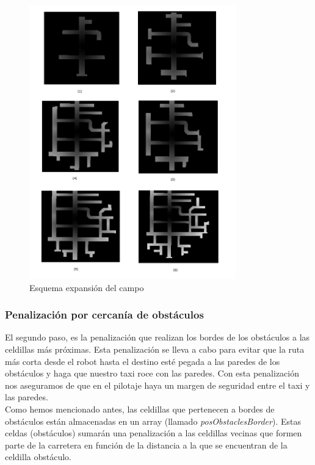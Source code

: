 \begin{figure}[H]
  \begin{center}
    \includegraphics[width=0.8\textwidth]{figures/GPP/expansiones.png}
		\caption{Esquema expansión del campo}
		\label{fig.expansiones_gpp}
		\end{center}
\end{figure}

\subsubsection{Penalización por cercanía de obstáculos}
El segundo paso, es la penalización que realizan los bordes de los obstáculos a las celdillas más próximas. Esta penalización se lleva a cabo para evitar que la ruta más corta desde el robot hasta el destino esté pegada a las paredes de los obstáculos y haga que nuestro taxi roce con las paredes. Con esta penalización nos aseguramos de que en el pilotaje haya un margen de seguridad entre el taxi y las paredes.\\

Como hemos mencionado antes, las celdillas que pertenecen a bordes de obstáculos están almacenadas en un array (llamado \textit{posObstaclesBorder}). Estas celdas (obstáculos) sumarán una penalización a las celdillas vecinas que formen parte de la carretera en función de la distancia a la que se encuentran de la celdilla obstáculo.\\

